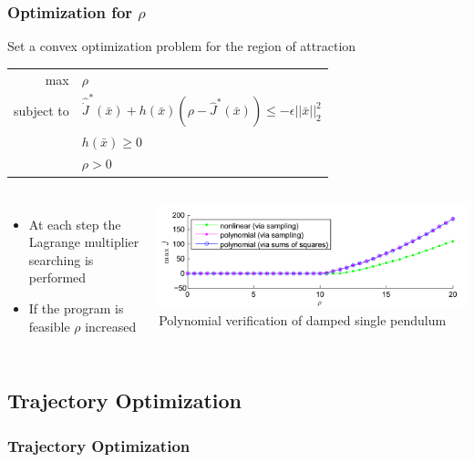 \documentclass{beamer}
\begin{document}

\begin{frame}
\frametitle{Optimization for $\rho$}
Set a convex optimization problem for the region of attraction 
\begin{center}
\begin{tabular}{ r l }
max & $\rho$ \\
subject to & $\hat{\dot{J}}^{\ast}(\bar{x})+ h(\bar{x})(\rho - \hat{J}^{\ast}(\bar{x}))\leq -\epsilon ||\bar{x}||_2^2$\\
 & $h(\bar{x})\geq 0$\\
 & $\rho>0$
\end{tabular}
\end{center}
\begin{columns}[c] 
\begin{itemize}
\item At each step the Lagrange multiplier searching is performed
\item If the program is feasible $\rho$ increased 
\end{itemize}

\centering
 \includegraphics[width=.95\textwidth]{figures/PolynomialVerification.png}\\
Polynomial verification of damped single pendulum  \cite{p1}
\end{columns}

\end{frame}


\subsection{Trajectory Optimization}
\begin{frame}
\frametitle{Trajectory Optimization}

\end{frame}

\end{document}
